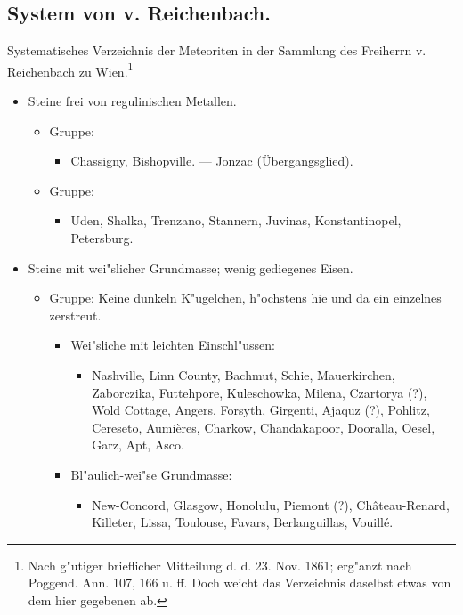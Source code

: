 \documentclass[a4paper, 11pt, oneside]{article}
\begin{document}
\subsection*{System von v. Reichenbach.}
\begin{center}
Systematisches Verzeichnis der Meteoriten in der Sammlung des Freiherrn v. Reichenbach zu Wien.\footnote{Nach g"utiger brieflicher Mitteilung d. d. 23. Nov. 1861; erg"anzt nach Poggend. Ann. 107, 166 u. ff. Doch weicht das Verzeichnis daselbst etwas von dem hier gegebenen ab.}
\end{center}
\begin{itemize}
    \item[1. Sippe.] Steine frei von regulinischen Metallen.
    \begin{itemize}
        \item[1.] Gruppe:
        \begin{itemize}
            \item Chassigny, Bishopville. --- Jonzac (Übergangsglied).
        \end{itemize}
        \item[2.] Gruppe:
        \begin{itemize}
            \item Uden, Shalka, Trenzano, Stannern, Juvinas, Konstantinopel, Petersburg.
        \end{itemize}
    \end{itemize}
    \item[2. Sippe.] Steine mit wei"slicher Grundmasse; wenig gediegenes Eisen.
    \begin{itemize}
        \item[1.] Gruppe: Keine dunkeln K"ugelchen, h"ochstens hie und da ein einzelnes zerstreut.
        \begin{itemize}
            \item[a.] Wei"sliche mit leichten Einschl"ussen:
            \begin{itemize}
                \item Nashville, Linn County, Bachmut, Schie, Mauerkirchen, Zaborczika, Futtehpore, Kuleschowka, Milena, Czartorya (?), Wold Cottage, Angers, Forsyth, Girgenti, Ajaquz (?), Pohlitz, Cereseto, Aumières, Charkow, Chandakapoor, Dooralla, Oesel, Garz, Apt, Asco.
            \end{itemize}
            \item[b.] Bl"aulich-wei"se Grundmasse:
            \begin{itemize}
                \item New-Concord, Glasgow, Honolulu, Piemont (?), Château-Renard, Killeter, Lissa, Toulouse, Favars, Berlanguillas, Vouillé.

\end{itemize}
\end{itemize}
\end{itemize}
\end{itemize}
\end{document}
